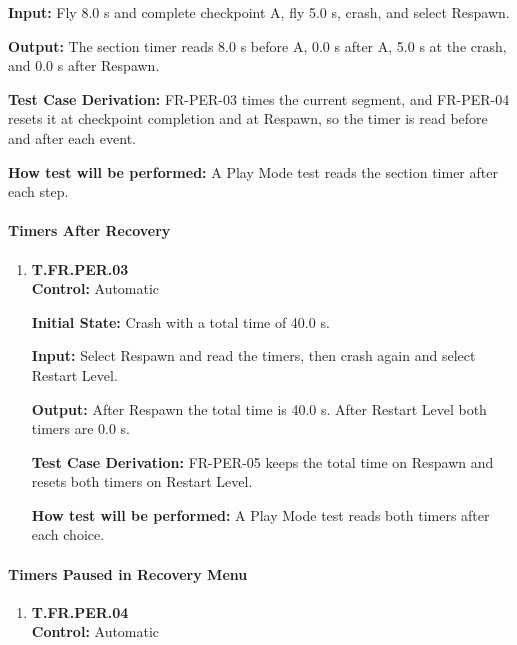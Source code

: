 \documentclass[12pt, titlepage]{article}
\begin{document}
{\begin{enumerate}
\textbf{Input:} Fly 8.0 s and complete checkpoint A, fly 5.0 s, crash, and select
Respawn.

\textbf{Output:} The section timer reads 8.0 s before A, 0.0 s after A, 5.0 s at the
crash, and 0.0 s after Respawn.

\textbf{Test Case Derivation:} \mbox{FR-PER-03} times the current segment, and
\mbox{FR-PER-04} resets it at checkpoint completion and at Respawn, so the timer is read
before and after each event.

\textbf{How test will be performed:} A Play Mode test reads the section timer after each
step.

\end{enumerate}

\paragraph{Timers After Recovery}

\begin{enumerate}

\item{\hypertarget{test-fr-per-03}{}\textbf{T.FR.PER.03}\\}
\textbf{Control:} Automatic

\textbf{Initial State:} Crash with a total time of 40.0 s.

\textbf{Input:} Select Respawn and read the timers, then crash again and select Restart
Level.

\textbf{Output:} After Respawn the total time is 40.0 s. After Restart Level both timers
are 0.0 s.

\textbf{Test Case Derivation:} \mbox{FR-PER-05} keeps the total time on Respawn and
resets both timers on Restart Level.

\textbf{How test will be performed:} A Play Mode test reads both timers after each
choice.

\end{enumerate}

\paragraph{Timers Paused in Recovery Menu}

\begin{enumerate}

\item{\hypertarget{test-fr-per-04}{}\textbf{T.FR.PER.04}\\}
\textbf{Control:} Automatic


\end{enumerate}}
\end{document}
